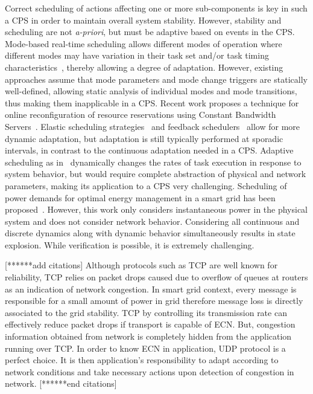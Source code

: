 Correct scheduling of actions affecting one or more sub-components is key in
such a CPS in order to maintain overall system stability. However, stability and
scheduling are not {\em a-priori}, but must be adaptive based on events in the
CPS. Mode-based real-time scheduling allows different modes of operation where
different modes may have variation in their task set and/or task timing
characteristics~\cite{sha_rts_1989, real_crespo_rts_2004, henia_ernst_rtss_2007,
stoimenov_date_2009}, thereby allowing a degree of adaptation. However, existing
approaches assume that mode parameters and mode change triggers are statically
well-defined, allowing static analysis of individual modes and mode transitions,
thus making them inapplicable in a CPS.
Recent work proposes a technique for online reconfiguration of resource
reservations using Constant Bandwidth
Servers~\cite{ReconfigurationCBSECRTST2012}. Elastic scheduling
strategies~\cite{Buttazzo_IEEE_Jornl_2002} and feedback
schedulers~\cite{FeedbackScheduling07} allow for more dynamic adaptation, but
adaptation is still typically performed at sporadic intervals, in contrast to
the continuous adaptation needed in a CPS. Adaptive scheduling as
in~\cite{AdaptiveScheduling_DASC_1999} dynamically changes the rates of task
execution in response to system behavior, but would require complete abstraction
of physical and network parameters, making its application to a CPS very
challenging. Scheduling of power demands for optimal energy management in a
smart grid has been proposed~\cite{SmartGridLoadScheduling}. However, this work
only considers instantaneous power in the physical system and does not consider
network behavior. Considering all continuous and discrete dynamics along with
dynamic behavior simultaneously results in state explosion. While verification
is possible, it is extremely challenging.

[******add citations]
Although protocols such as TCP are well known for reliability, TCP relies on packet 
drops caused due to overflow of queues at routers as an indication of network congestion. 
In smart grid context, every message is responsible for a small amount of power in
grid therefore message loss is directly associated to the grid stability. TCP by controlling 
its transmission rate can effectively reduce packet drops if transport is capable of ECN.
But, congestion information obtained from network is completely hidden from the application
running over TCP. In order to know ECN in application, UDP protocol is a perfect choice.
It is then application's responsibility to adapt according to network conditions and take 
necessary actions upon detection of congestion in network.
[******end citations]

